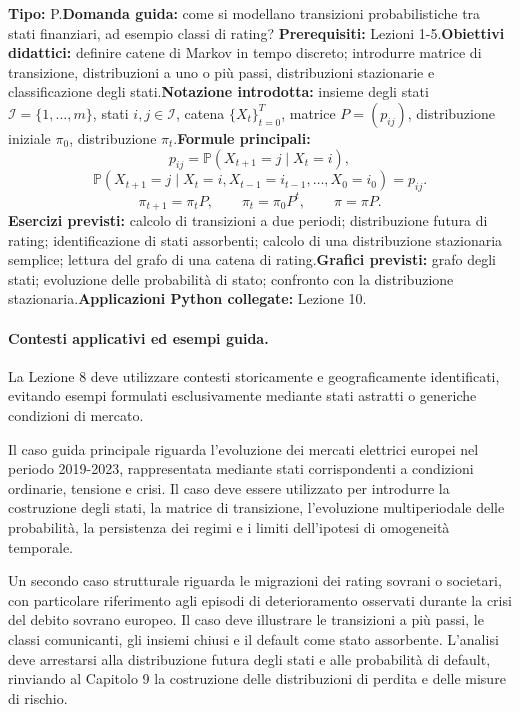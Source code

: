 \documentclass[12pt,a4paper]{article}%
\newcommand{\1}{\mathbf{1}}
\begin{document}
\textbf{Tipo:} P.\newline\textbf{Domanda guida:} come si modellano transizioni
probabilistiche tra stati finanziari, ad esempio classi di rating?\newline%
\textbf{Prerequisiti:} Lezioni 1-5.\newline\textbf{Obiettivi didattici:}
definire catene di Markov in tempo discreto; introdurre matrice di
transizione, distribuzioni a uno o pi\`{u} passi, distribuzioni stazionarie e
classificazione degli stati.\newline\textbf{Notazione introdotta:} insieme
degli stati $\mathcal{I}=\{1,\ldots,m\}$, stati $i,j\in\mathcal{I}$, catena
$\{X_{t}\}_{t=0}^{T}$, matrice $P=(p_{ij})$, distribuzione iniziale $\pi_{0}$,
distribuzione $\pi_{t}$.\newline\textbf{Formule principali:}
\[
p_{ij}=\mathbb{P}(X_{t+1}=j\mid X_{t}=i),
\]
\[
\mathbb{P}(X_{t+1}=j\mid X_{t}=i,X_{t-1}=i_{t-1},\ldots,X_{0}=i_{0})=p_{ij}.
\]
\[
\pi_{t+1}=\pi_{t}P, \qquad\pi_{t}=\pi_{0}P^{t}, \qquad\pi=\pi P.
\]
\textbf{Esercizi previsti:} calcolo di transizioni a due periodi;
distribuzione futura di rating; identificazione di stati assorbenti; calcolo
di una distribuzione stazionaria semplice; lettura del grafo di una catena di
rating.\newline\textbf{Grafici previsti:} grafo degli stati; evoluzione delle
probabilit\`{a} di stato; confronto con la distribuzione
stazionaria.\newline\textbf{Applicazioni Python collegate:} Lezione 10.

\paragraph{Contesti applicativi ed esempi guida.}

La Lezione 8 deve utilizzare contesti storicamente e geograficamente
identificati, evitando esempi formulati esclusivamente mediante stati
astratti o generiche condizioni di mercato.

Il caso guida principale riguarda l'evoluzione dei mercati elettrici
europei nel periodo 2019-2023, rappresentata mediante stati corrispondenti
a condizioni ordinarie, tensione e crisi. Il caso deve essere utilizzato
per introdurre la costruzione degli stati, la matrice di transizione,
l'evoluzione multiperiodale delle probabilit\`{a}, la persistenza dei
regimi e i limiti dell'ipotesi di omogeneit\`{a} temporale.

Un secondo caso strutturale riguarda le migrazioni dei rating sovrani o
societari, con particolare riferimento agli episodi di deterioramento
osservati durante la crisi del debito sovrano europeo. Il caso deve
illustrare le transizioni a pi\`{u} passi, le classi comunicanti, gli
insiemi chiusi e il default come stato assorbente. L'analisi deve
arrestarsi alla distribuzione futura degli stati e alle probabilit\`{a}
di default, rinviando al Capitolo 9 la costruzione delle distribuzioni
di perdita e delle misure di rischio.
\end{document}
